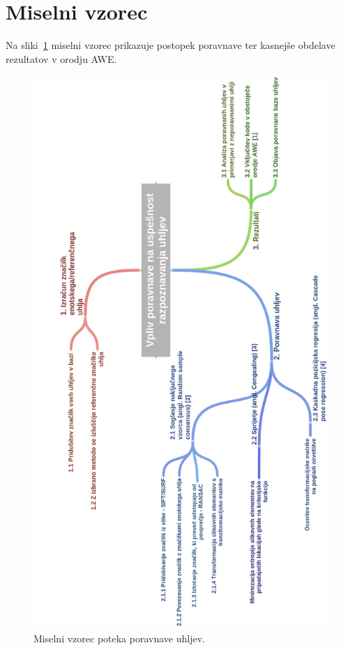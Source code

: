\documentclass[11pt,a4paper]{article}
\begin{document}
\section{Miselni vzorec}

Na sliki~\ref{fig:miselni_vzorec} miselni vzorec prikazuje postopek poravnave ter kasnejše obdelave rezultatov v orodju AWE.

\begin{figure}[p]
    \includegraphics[scale=0.345]{diagram_final}
    \caption{Miselni vzorec poteka poravnave uhljev.}
    \label{fig:miselni_vzorec}
\end{figure}
\end{document}
